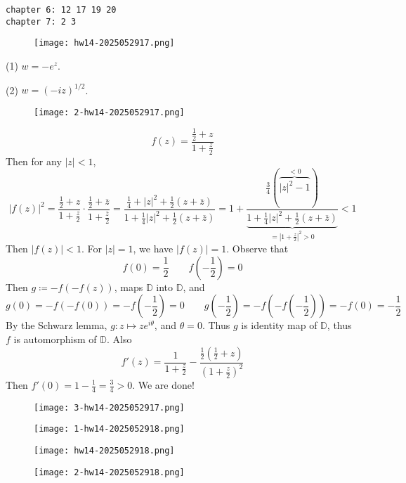\begin{lstlisting}
chapter 6: 12 17 19 20
chapter 7: 2 3
\end{lstlisting}
\begin{exercise}
\begin{figure}[H]
\centering
\texttt{[image: hw14-2025052917.png]}
\label{}
\end{figure}
\end{exercise}
(1) $w=-e^{ z }$.

(2) $w=(-iz)^{1/2}$.

\begin{exercise}
\begin{figure}[H]
\centering
\texttt{[image: 2-hw14-2025052917.png]}
\label{}
\end{figure}
\end{exercise}
\[
f(z)=\frac{\frac{1}{2}+z}{1+\frac{z}{2}}
\]
Then for any $\lvert z \rvert<1$,
\[
\lvert f(z) \rvert ^2=\frac{\frac{1}{2}+z}{1+\frac{z}{2}}\cdot \frac{\frac{1}{2}+\overline{z}}{1+\frac{\overline{z}}{2}}=\frac{\frac{1}{4}+\lvert z \rvert ^2+\frac{1}{2}(z+\overline{z})}{1+\frac{1}{4}\lvert z \rvert ^2+\frac{1}{2}(z+\overline{z})}=1+\frac{\frac{3}{4}(\overbrace{ \lvert z \rvert ^2-1 }^{ <0 })}{\underbrace{ 1+\frac{1}{4}\lvert z \rvert ^2+\frac{1}{2}(z+\overline{z}) }_{ =\left\lvert  1+\frac{z}{2}  \right\rvert ^2>0 }}<1
\]
Then $\lvert f(z) \rvert<1$. For $\lvert z \rvert=1$, we have $\lvert f(z) \rvert=1$. Observe that
\[
f(0)=\frac{1}{2}\qquad f\left( -\frac{1}{2} \right)=0
\]
Then $g\coloneqq -f(-f(z))$, maps $\mathbb{D}$ into $\mathbb{D}$, and
\[
g(0)=-f(-f(0))=-f\left( -\frac{1}{2} \right)=0\qquad g\left( -\frac{1}{2} \right)=-f\left( -f\left( -\frac{1}{2} \right) \right)=-f(0)=-\frac{1}{2}
\]
By the Schwarz lemma, $g:z\mapsto ze^{ i\theta }$, and $\theta=0$. Thus $g$ is identity map of $\mathbb{D}$, thus $f$ is automorphism of $\mathbb{D}$. Also
\[
f'(z)=\frac{1}{1+\frac{z}{2}}-\frac{\frac{1}{2}\left( \frac{1}{2}+z \right)}{\left( 1+\frac{z}{2} \right)^2}
\]
Then $f'(0)=1-\frac{1}{4}=\frac{3}{4}>0$. We are done!

\begin{exercise}
\begin{figure}[H]
\centering
\texttt{[image: 3-hw14-2025052917.png]}
\label{}
\end{figure}
\end{exercise}
\begin{figure}[H]
\centering
\texttt{[image: 1-hw14-2025052918.png]}
\label{}
\end{figure}
\begin{figure}[H]
\centering
\texttt{[image: hw14-2025052918.png]}
\label{}
\end{figure}
\begin{figure}[H]
\centering
\texttt{[image: 2-hw14-2025052918.png]}
\label{}
\end{figure}

